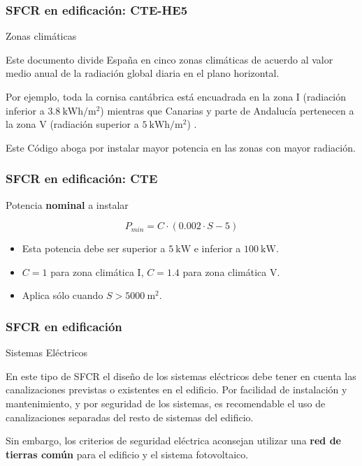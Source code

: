 \documentclass[serif, xcolor=dvipsnames]{beamer}
\begin{document}
\begin{frame}
  \frametitle{SFCR en edificación: CTE-HE5}
  \begin{block} {Zonas climáticas}

    Este documento divide España en cinco zonas climáticas de acuerdo
    al valor medio anual de la radiación global diaria en el plano
    horizontal.

    Por ejemplo, toda la cornisa cantábrica está encuadrada en la zona
    I (radiación inferior a $\SI{3.8}{\kWh\per\meter\squared}$)
    mientras que Canarias y parte de Andalucía pertenecen a la zona V
    (radiación superior a $\SI{5}{\kWh\per\meter\squared}$) .

    Este Código aboga por instalar mayor potencia en las zonas con
    mayor radiación.

  \end{block}

\end{frame}
\begin{frame}
  \frametitle{SFCR en edificación: CTE}
  \begin{block} {Potencia \textbf{nominal} a instalar}

\[
P_{min}=C\cdot(0.002\cdot S - 5)\]

\begin{itemize}
\item Esta potencia debe ser superior a $\SI{5}{\kilo\watt}$ e
  inferior a $\SI{100}{\kilo\watt}$.
\item $C=1$ para zona climática I, $C=1.4$ para zona climática V.
\item Aplica sólo cuando $S > \SI{5000}{\meter\squared}$.
\end{itemize}


\end{block}

\end{frame}
\begin{frame}
  \frametitle{SFCR en edificación}
  \begin{block} {Sistemas Eléctricos}

    En este tipo de SFCR el diseño de los sistemas eléctricos debe
    tener en cuenta las canalizaciones previstas o existentes en el
    edificio.  Por facilidad de instalación y mantenimiento, y por
    seguridad de los sistemas, es recomendable el uso de
    canalizaciones separadas del resto de sistemas del edificio.

    Sin embargo, los criterios de seguridad eléctrica aconsejan
    utilizar una \textbf{red de tierras común} para el edificio y el
    sistema fotovoltaico.

  \end{block}

\end{frame}
\end{document}
